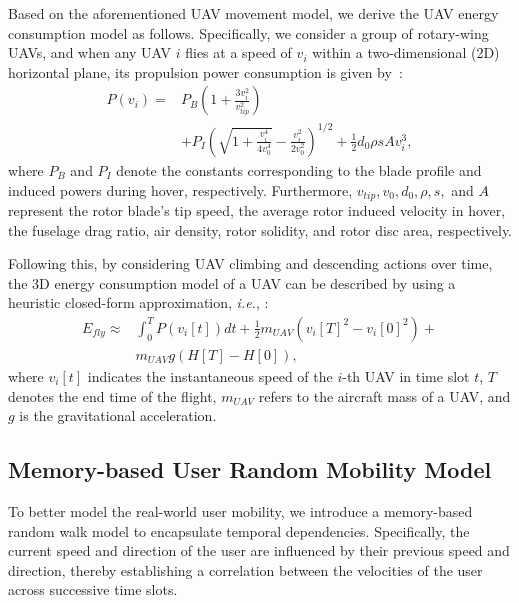 \documentclass[10pt,journal,compsoc]{IEEEtran}
\begin{document}
\par Based on the aforementioned UAV movement model, we derive the UAV energy consumption model as follows. Specifically, we consider a group of rotary-wing UAVs, and when any UAV $i$ flies at a speed of $v_i$ within a two-dimensional (2D) horizontal plane, its propulsion power consumption is given by~\cite{zeng2019energy}: 
\begin{equation}
\begin{split}
    P(v_i) = & P_B \left( 1 + \frac{3 v_i^2}{v_{tip}^2} \right) \\ &+ P_I \left( \sqrt{1 + \frac{v_i^4}{4v_0^4}} - \frac{v_i^2}{2 v_0^2} \right)^{1/2} + \frac{1}{2} d_0 \rho s A v_i^3, 
\end{split}
\end{equation}
\noindent where $P_B$ and $P_I$ denote the constants corresponding to the blade profile and induced powers during hover, respectively. Furthermore, $v_{tip}, v_0, d_0, \rho, s,$ and $A$ represent the rotor blade's tip speed, the average rotor induced velocity in hover, the fuselage drag ratio, air density, rotor solidity, and rotor disc area, respectively.

\par Following this, by considering UAV climbing and descending actions over time, the 3D energy consumption model of a UAV can be described by using a heuristic closed-form approximation, \textit{i.e.}, \cite{zeng2019accessing}:
\begin{equation}
    \begin{split}
        E_{fly} \approx & \int_0^T P(v_i[t]) dt + \frac{1}{2} m_{UAV} ( v_i[T]^2 - v_i[0]^2) + \\ & m_{UAV} g(H[T] - H[0]), 
    \end{split}
\end{equation}
\noindent where $v_i[t]$ indicates the instantaneous speed of the $i$-th UAV in time slot $t$, $T$ denotes the end time of the flight, $m_{UAV}$ refers to the aircraft mass of a UAV, and $g$ is the gravitational acceleration.


\subsection{Memory-based User Random Mobility Model}
\label{subsec: memory-based user random walk model}

\par To better model the real-world user mobility, we introduce a memory-based random walk model to encapsulate temporal dependencies. Specifically, the current speed and direction of the user are influenced by their previous speed and direction, thereby establishing a correlation between the velocities of the user across successive time slots.
\end{document}
